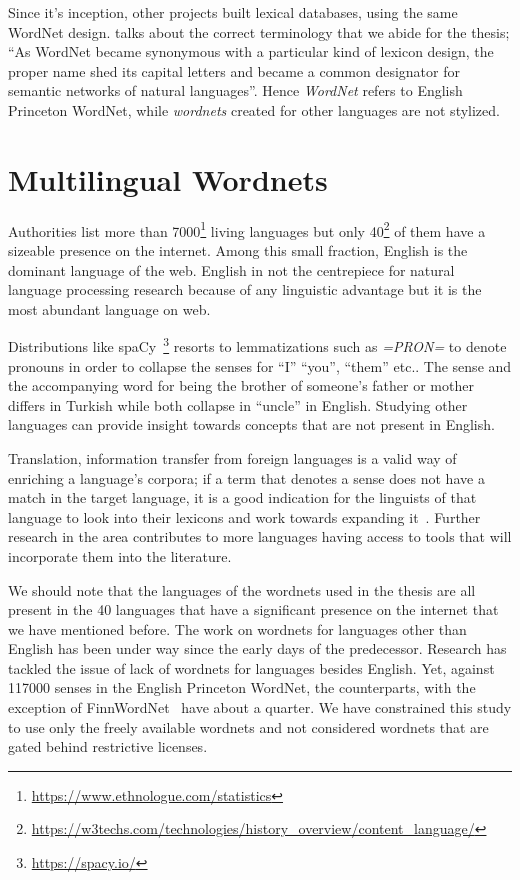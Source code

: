 Since it's inception, other projects built lexical databases, using the same WordNet design.
\textcite{fellbaum_semantic_1998} talks about the correct terminology that we abide for the thesis; \enquote{As WordNet became synonymous with a particular kind of lexicon design, the proper name shed its capital letters and became a common designator for semantic networks of natural languages}.
Hence \emph{WordNet} refers to English Princeton WordNet, while \emph{wordnets} created for other languages are not stylized.

\section{Multilingual Wordnets}%
\label{sec:multilingual_wordnets}
Authorities list more than 7000\footnote{\url{https://www.ethnologue.com/statistics}} living languages but only 40\footnote{\url{https://w3techs.com/technologies/history_overview/content_language/}} of them have a sizeable presence on the internet.
Among this small fraction, English is the dominant language of the web.
English in not the centrepiece for natural language processing research because of any linguistic advantage but it is the most abundant language on web.

Distributions like spaCy~\footnote{\url{https://spacy.io/}} resorts to lemmatizations such as \emph{=PRON=} to denote pronouns in order to collapse the senses for \enquote{I} \enquote{you}, \enquote{them} etc.\@.
The sense and the accompanying word for being the brother of someone's father or mother differs in Turkish while both collapse in \enquote{uncle} in English.
Studying other languages can provide insight towards concepts that are not present in English.

Translation, information transfer from foreign languages is a valid way of enriching a language's corpora; if a term that denotes a sense does not have a match in the target language, it is a good indication for the linguists of that language to look into their lexicons and work towards expanding it~\cite{ibrahim_usta_turkce_2006}.
Further research in the area contributes to more languages having access to tools that will incorporate them into the literature.

We should note that the languages of the wordnets used in the thesis are all present in the 40 languages that have a significant presence on the internet that we have mentioned before.
The work on wordnets for languages other than English has been under way since the early days of the predecessor.
Research has tackled the issue of lack of wordnets for languages besides English. %
Yet, against 117000 senses in the English Princeton WordNet, the counterparts, with the exception of FinnWordNet~\cite{linden_finnwordnet_2010} have about a quarter.
We have constrained this study to use only the freely available wordnets and not considered wordnets that are gated behind restrictive licenses.


